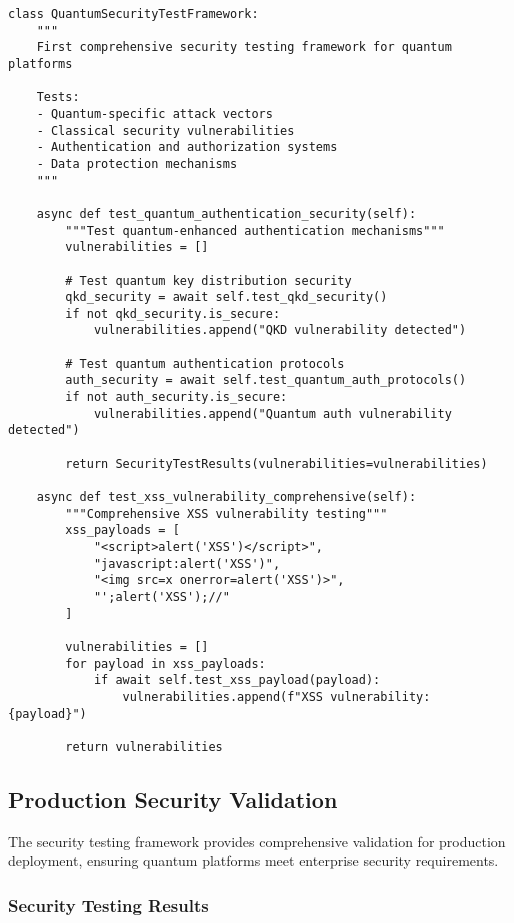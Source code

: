 \documentclass[12pt,a4paper]{report}
\begin{document}
\begin{lstlisting}
class QuantumSecurityTestFramework:
    """
    First comprehensive security testing framework for quantum platforms

    Tests:
    - Quantum-specific attack vectors
    - Classical security vulnerabilities
    - Authentication and authorization systems
    - Data protection mechanisms
    """

    async def test_quantum_authentication_security(self):
        """Test quantum-enhanced authentication mechanisms"""
        vulnerabilities = []

        # Test quantum key distribution security
        qkd_security = await self.test_qkd_security()
        if not qkd_security.is_secure:
            vulnerabilities.append("QKD vulnerability detected")

        # Test quantum authentication protocols
        auth_security = await self.test_quantum_auth_protocols()
        if not auth_security.is_secure:
            vulnerabilities.append("Quantum auth vulnerability detected")

        return SecurityTestResults(vulnerabilities=vulnerabilities)

    async def test_xss_vulnerability_comprehensive(self):
        """Comprehensive XSS vulnerability testing"""
        xss_payloads = [
            "<script>alert('XSS')</script>",
            "javascript:alert('XSS')",
            "<img src=x onerror=alert('XSS')>",
            "';alert('XSS');//"
        ]

        vulnerabilities = []
        for payload in xss_payloads:
            if await self.test_xss_payload(payload):
                vulnerabilities.append(f"XSS vulnerability: {payload}")

        return vulnerabilities
\end{lstlisting}

\subsection{Production Security Validation}

The security testing framework provides comprehensive validation for production deployment, ensuring quantum platforms meet enterprise security requirements.

\subsubsection{Security Testing Results}
\end{document}
